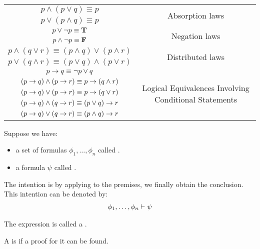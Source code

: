 \begin{center}
\begin{tabular}{|c|c|}
        $p \land (p \lor q) \equiv p$
          & \multirow{2}{*}{Absorption laws} \\
        $p \lor (p \land q) \equiv p$ & \\
        \hline

        $p \lor \lnot p \equiv \mathbf{T}$ & \multirow{2}{*}{Negation laws} \\
        $p \land \lnot p \equiv \mathbf{F}$ & \\
        \hline

        $p \land (q \lor r) \equiv (p \land q) \lor (p \land r)$
          & \multirow{2}{*}{Distributed laws} \\
        $p \lor (q \land r) \equiv (p \lor q) \land (p \lor r)$ & \\
        \hline

        $p \rightarrow q \equiv \lnot p \lor q$
        & \multirow{5}{*}{Logical Equivalences Involving Conditional Statements} \\
        $(p \rightarrow q) \land (p \rightarrow r) \equiv p \rightarrow (q \land r)$
        & \\
        $(p \rightarrow q) \lor (p \rightarrow r) \equiv p \rightarrow (q \lor r)$
        & \\
        $(p \rightarrow q) \land (q \rightarrow r) \equiv (p \lor q) \rightarrow r$
        & \\
        $(p \rightarrow q) \lor (q \rightarrow r) \equiv (p \land q) \rightarrow r$
        & \\
        \hline
      \end{tabular}
    \end{center}

  \begin{itemize}

  \end{itemize}

    \par Suppose we have:
    \begin{itemize}
      \item a set of formulas $\phi_1, \ldots, \phi_n$ called .
      \item a formula $\psi$ called .
    \end{itemize}

    \par The intention is by applying  to the premises, we finally obtain the conclusion. This intention can be denoted by:
    \begin{align*}
      \phi_1, \ldots, \phi_n \vdash \psi
    \end{align*}
    \par The expression is called a .
    \par A  is  if a proof for it can be found.

